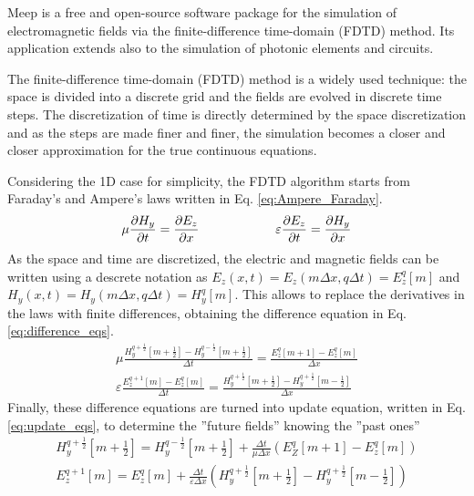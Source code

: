 Meep is a free and open-source software package for the simulation of electromagnetic fields via the finite-difference time-domain (FDTD) method.
Its application extends also to the simulation of photonic elements and circuits.  

The finite-difference time-domain (FDTD) method is a widely used technique: the space is divided into a discrete grid and the fields are evolved in discrete time steps.
The discretization of time is directly determined by the space discretization and as the steps are made finer and finer, the simulation becomes a closer and closer approximation for the true continuous equations.

Considering the 1D case for simplicity, the FDTD algorithm starts from Faraday's and Ampere's laws written in Eq. \ref*{eq:Ampere_Faraday}.
\begin{equation} \label{eq:Ampere_Faraday}
    \mu \pdv{H_y}{t} = \pdv{E_z}{x} \qquad\qquad\qquad \varepsilon \pdv{E_z}{t} = \pdv{H_y}{x}
\end{equation}
As the space and time are discretized, the electric and magnetic fields can be written using a descrete notation as \(E_z(x, t) = E_z (m\Delta x, q \Delta t) = E_z^q[m]\) and \(H_y(x, t) = H_y(m\Delta x, q \Delta t) = H_y^q[m]\). This allows to replace the derivatives in the laws with finite differences, obtaining the difference equation in Eq. \ref*{eq:difference_eqs}.
\begin{align}\label{eq:difference_eqs}
    \mu \frac{H_y^{q+\frac{1}{2}}[m+\frac{1}{2}] - H_y^{q-\frac{1}{2}}[m+\frac{1}{2}]}{\Delta t} = \frac{E_z^q[m+1] - E_z^q[m]}{\Delta x}
    \\
    \varepsilon\frac{E_z^{q+1}[m] - E_z^q[m]}{\Delta t} = \frac{H_y^{q+\frac{1}{2}}[m+\frac{1}{2}] - H_y^{q+\frac{1}{2}}[m-\frac{1}{2}]}{\Delta x}
\end{align}
Finally, these difference equations are turned into update equation, written in Eq. \ref*{eq:update_eqs}, to determine the ''future fields'' knowing the ''past ones''
\begin{align}\label{eq:update_eqs}
    H_y^{q+\frac{1}{2}} \left[ m+\frac{1}{2} \right] = H_y^{q-\frac{1}{2}} \left[ m+\frac{1}{2} \right] + \frac{\Delta t}{\mu \Delta x} \left( E_Z^q[m+1] - E_z^q[m] \right)
    \\
    E_z^{q+1} [m] = E_z^q[m] + \frac{\Delta t}{\varepsilon \Delta x} \left( H_y^{q+\frac{1}{2}}\left[ m+\frac{1}{2} \right] - H_y^{q+\frac{1}{2}}\left[ m-\frac{1}{2} \right] \right)
\end{align}

